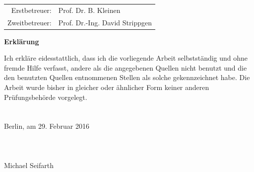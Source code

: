 \noindent \begin{center}
\medskip{}
\begin{tabular}{rl}
Erstbetreuer: & Prof. Dr. B. Kleinen\tabularnewline
Zweitbetreuer: & Prof. Dr.-Ing. David Strippgen\tabularnewline
\end{tabular}
\par\end{center}

\newpage{}
\thispagestyle{empty}

\hfill\break
\hfill\break
\hfill\break
\hfill\break
\hfill\break
\hfill\break
\hfill\break
\hfill\break
\hfill\break
\hfill\break
\hfill\break

\textbf{Erklärung}

Ich erkläre eidesstattlich, dass ich die vorliegende Arbeit selbstständig und
ohne fremde Hilfe verfasst, andere als die angegebenen Quellen nicht benutzt
und die den benutzten Quellen entnommenen Stellen als solche gekennzeichnet habe.
Die Arbeit wurde bisher in gleicher oder ähnlicher Form keiner
anderen Prüfungsbehörde vorgelegt.\\
\\
\\
Berlin, am 29. Februar 2016\\
\\
\\
\\
Michael Seifarth

\newpage{}